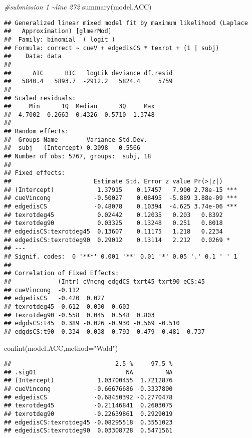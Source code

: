 \documentclass[
]{article}
\newenvironment{Shaded}{\begin{snugshade}}{\end{snugshade}}
\newcommand{\AttributeTok}[1]{\textcolor[rgb]{0.77,0.63,0.00}{#1}}
\newcommand{\CommentTok}[1]{\textcolor[rgb]{0.56,0.35,0.01}{\textit{#1}}}
\newcommand{\FunctionTok}[1]{\textcolor[rgb]{0.00,0.00,0.00}{#1}}
\newcommand{\NormalTok}[1]{#1}
\newcommand{\StringTok}[1]{\textcolor[rgb]{0.31,0.60,0.02}{#1}}
\begin{document}
\begin{Shaded}
\begin{Highlighting}[]
\CommentTok{\#submission 1 \textasciitilde{}line 272}
\FunctionTok{summary}\NormalTok{(model.ACC)}
\end{Highlighting}
\end{Shaded}

\begin{verbatim}
## Generalized linear mixed model fit by maximum likelihood (Laplace
##   Approximation) [glmerMod]
##  Family: binomial  ( logit )
## Formula: correct ~ cueV + edgedisCS * texrot + (1 | subj)
##    Data: data
## 
##      AIC      BIC   logLik deviance df.resid 
##   5840.4   5893.7  -2912.2   5824.4     5759 
## 
## Scaled residuals: 
##     Min      1Q  Median      3Q     Max 
## -4.7002  0.2663  0.4326  0.5710  1.3748 
## 
## Random effects:
##  Groups Name        Variance Std.Dev.
##  subj   (Intercept) 0.3098   0.5566  
## Number of obs: 5767, groups:  subj, 18
## 
## Fixed effects:
##                       Estimate Std. Error z value Pr(>|z|)    
## (Intercept)            1.37915    0.17457   7.900 2.78e-15 ***
## cueVincong            -0.50027    0.08495  -5.889 3.88e-09 ***
## edgedisCS             -0.48078    0.10394  -4.625 3.74e-06 ***
## texrotdeg45            0.02442    0.12035   0.203   0.8392    
## texrotdeg90            0.03325    0.13248   0.251   0.8018    
## edgedisCS:texrotdeg45  0.13607    0.11175   1.218   0.2234    
## edgedisCS:texrotdeg90  0.29012    0.13114   2.212   0.0269 *  
## ---
## Signif. codes:  0 '***' 0.001 '**' 0.01 '*' 0.05 '.' 0.1 ' ' 1
## 
## Correlation of Fixed Effects:
##             (Intr) cVncng edgdCS txrt45 txrt90 eCS:45
## cueVincong  -0.112                                   
## edgedisCS   -0.420  0.027                            
## texrotdeg45 -0.612  0.030  0.603                     
## texrotdeg90 -0.558  0.045  0.548  0.803              
## edgdsCS:t45  0.389 -0.026 -0.930 -0.569 -0.510       
## edgdsCS:t90  0.334 -0.038 -0.793 -0.479 -0.481  0.737
\end{verbatim}

\begin{Shaded}
\begin{Highlighting}[]
\FunctionTok{confint}\NormalTok{(model.ACC,}\AttributeTok{method=}\StringTok{"Wald"}\NormalTok{)}
\end{Highlighting}
\end{Shaded}

\begin{verbatim}
##                             2.5 %     97.5 %
## .sig01                         NA         NA
## (Intercept)            1.03700455  1.7212876
## cueVincong            -0.66676686 -0.3337800
## edgedisCS             -0.68450392 -0.2770478
## texrotdeg45           -0.21146841  0.2603075
## texrotdeg90           -0.22639861  0.2929019
## edgedisCS:texrotdeg45 -0.08295518  0.3551023
## edgedisCS:texrotdeg90  0.03308728  0.5471561
\end{verbatim}
\end{document}
